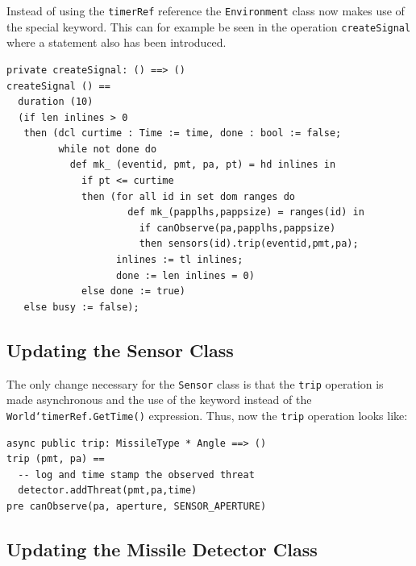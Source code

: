 \documentclass{overturerepchap}
\begin{document}
Instead of using the \texttt{timerRef} reference the
\texttt{Environment} class now makes use of the special {\bf{}}
keyword. This can for example be seen in the operation
\texttt{createSignal} where a {\bf{}} statement also has
been introduced.

\begin{lstlisting}
private createSignal: () ==> ()
createSignal () ==
  duration (10) 
  (if len inlines > 0
   then (dcl curtime : Time := time, done : bool := false;
         while not done do
           def mk_ (eventid, pmt, pa, pt) = hd inlines in
             if pt <= curtime
             then (for all id in set dom ranges do
                     def mk_(papplhs,pappsize) = ranges(id) in
                       if canObserve(pa,papplhs,pappsize)
                       then sensors(id).trip(eventid,pmt,pa);
                   inlines := tl inlines;
                   done := len inlines = 0)
             else done := true)
   else busy := false);
\end{lstlisting}




\subsection{Updating the Sensor Class}

The only change necessary for the \texttt{Sensor} class is that the 
\texttt{trip} operation is made asynchronous and the use of the 
{\bf{}} keyword instead of the \texttt{World`timerRef.GetTime()} 
expression. Thus, now the \texttt{trip} operation looks like:

\begin{lstlisting}
async public trip: MissileType * Angle ==> ()
trip (pmt, pa) ==
  -- log and time stamp the observed threat
  detector.addThreat(pmt,pa,time)
pre canObserve(pa, aperture, SENSOR_APERTURE)
\end{lstlisting}

\subsection{Updating the Missile Detector Class}
\end{document}
